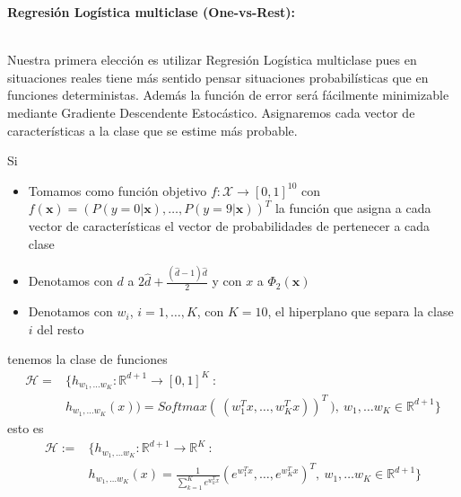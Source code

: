 \documentclass[11pt,a4paper]{article}
\theoremstyle{definition}
\newcommand{\R}{\mathbb{R}}
\begin{document}
	\textbf{Regresión Logística multiclase (One-vs-Rest):} $\quad \quad \quad \quad \quad \quad \quad \quad \quad \quad \quad \quad \quad \quad \quad \quad \quad  $ %
	
	Nuestra primera elección es utilizar Regresión Logística multiclase pues en situaciones reales tiene más sentido pensar situaciones probabilísticas que en funciones deterministas. Además la función de error será fácilmente minimizable mediante Gradiente Descendente Estocástico. Asignaremos cada vector de características a la clase que se estime más probable.
	
	Si 
	\begin{itemize}
	\item Tomamos como función objetivo $f\colon \mathcal{X} \to [0,1]^{10}$ con $f(\mathbf{x})=(P(y=0|\mathbf{x}),\ldots, P(y=9|\mathbf{x}))^T$ la función que asigna a cada vector de características el vector de probabilidades de pertenecer a cada clase 
	\item Denotamos con $d$ a $2\hat d + \frac{(\hat d -1)\hat d}{2}$ y con $x$ a $\Phi_2(\mathbf{x})$
	\item Denotamos con $w_i$, $i=1,\ldots , K$, con $K=10$, el hiperplano que separa la clase $i$ del resto
	\end{itemize}
	tenemos la clase de funciones
	\begin{equation*}
\begin{aligned}
\mathcal{H}= & \Big\{h_{w_1,\ldots w_K} \colon \R^{d+1} \to [0,1]^K \ : \\
      & h_{w_1,\ldots w_K} (x))=Softmax(\ (w_1^T x, \ldots, w_K^T x))^T \ ),\ w_1,\ldots w_K \in \R^{d+1}\Big\}
      \end{aligned}
\end{equation*}
	esto es
      \begin{equation*}
\begin{aligned}
      \mathcal{H}:=& \Big\{h_{w_1,\ldots w_K} \colon \R^{d+1} \to \R^K \ :\\
      & h_{w_1,\ldots w_K} (x)=\frac{1}{\sum_{k=1}^K e^{w_k^T x}}(e^{w_1^T x}, \ldots, e^{w_K^T x})^T,\ w_1,\ldots w_K \in \R^{d+1}\Big\}
\end{aligned}
\end{equation*}
	
\end{document}
